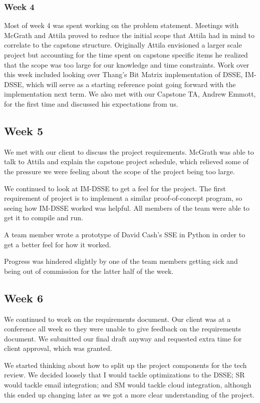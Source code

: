 \subsubsection{Week 4}
Most of week 4 was spent working on the problem statement. Meetings with McGrath and Attila proved to reduce the initial scope that Attila had in mind to correlate to the capstone structure. Originally Attila envisioned a larger scale project but accounting for the time spent on capstone specific items he realized that the scope was too large for our knowledge and time constraints. Work over this week included looking over Thang's Bit Matrix implementation of DSSE, IM-DSSE, which will serve as a starting reference point going forward with the implementation next term. We also met with our Capstone TA, Andrew Emmott, for the first time and discussed his expectations from us. 

\subsection{Week 5}

We met with our client to discuss the project requirements. McGrath was able to talk to Attila and explain the capstone project schedule, which relieved some of the pressure we were feeling about the scope of the project being too large.

We continued to look at IM-DSSE to get a feel for the project. The first requirement of project is to implement a similar proof-of-concept program, so seeing how IM-DSSE worked was helpful. All members of the team were able to get it to compile and run.

A team member wrote a prototype of David Cash's SSE in Python in order to get a better feel for how it worked.

Progress was hindered slightly by one of the team members getting sick and being out of commission for the latter half of the week.

\subsection{Week 6}

We continued to work on the requirements document. Our client was at a conference all week so they were unable to give feedback on the requirements document. We submitted our final draft anyway and requested extra time for client approval, which was granted.

We started thinking about how to split up the project components for the tech review. We decided loosely that I would tackle optimizations to the DSSE; SR would tackle email integration; and SM would tackle cloud integration, although this ended up changing later as we got a more clear understanding of the project.

